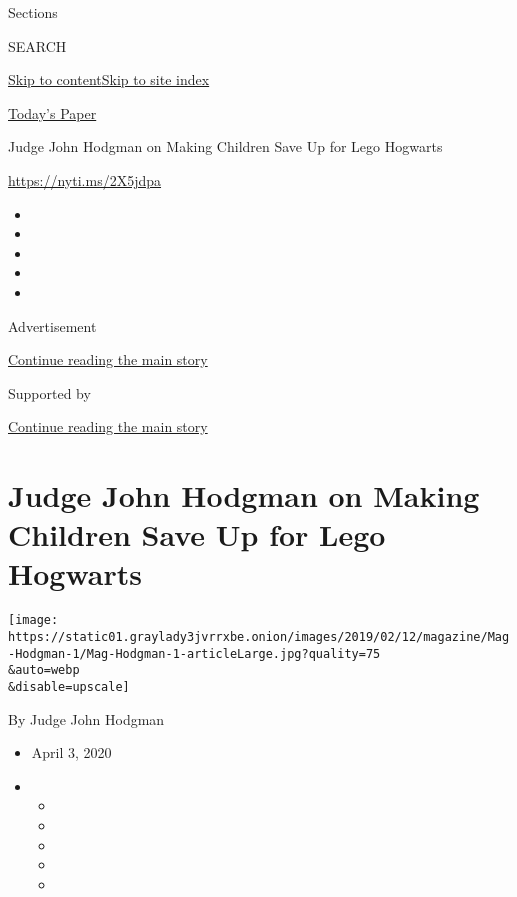 Sections

SEARCH

\protect\hyperlink{site-content}{Skip to
content}\protect\hyperlink{site-index}{Skip to site index}

\href{https://myaccount.nytimes3xbfgragh.onion/auth/login?response_type=cookie\&client_id=vi}{}

\href{https://www.nytimes3xbfgragh.onion/section/todayspaper}{Today's
Paper}

Judge John Hodgman on Making Children Save Up for Lego Hogwarts

\url{https://nyti.ms/2X5jdpa}

\begin{itemize}
\item
\item
\item
\item
\item
\end{itemize}

Advertisement

\protect\hyperlink{after-top}{Continue reading the main story}

Supported by

\protect\hyperlink{after-sponsor}{Continue reading the main story}

\hypertarget{judge-john-hodgman-on-making-children-save-up-for-lego-hogwarts}{%
\section{Judge John Hodgman on Making Children Save Up for Lego
Hogwarts}\label{judge-john-hodgman-on-making-children-save-up-for-lego-hogwarts}}

\texttt{[image: https://static01.graylady3jvrrxbe.onion/images/2019/02/12/magazine/Mag-Hodgman-1/Mag-Hodgman-1-articleLarge.jpg?quality=75\\\&auto=webp\\\&disable=upscale]}

By Judge John Hodgman

\begin{itemize}
\item
  April 3, 2020
\item
  \begin{itemize}
  \item
  \item
  \item
  \item
  \item
  \end{itemize}
\end{itemize}

